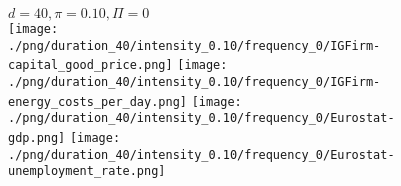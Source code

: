 \begin{figure}[ht!]
\centering\leavevmode
\begin{minipage}{13cm}
\centering\leavevmode
{$d=40, \pi=0.10, \Pi=0$}\\
\texttt{[image: ./png/duration\_40/intensity\_0.10/frequency\_0/IGFirm-capital\_good\_price.png]}
\texttt{[image: ./png/duration\_40/intensity\_0.10/frequency\_0/IGFirm-energy\_costs\_per\_day.png]}
\texttt{[image: ./png/duration\_40/intensity\_0.10/frequency\_0/Eurostat-gdp.png]}
\texttt{[image: ./png/duration\_40/intensity\_0.10/frequency\_0/Eurostat-unemployment\_rate.png]}
\end{minipage}
\end{figure}

